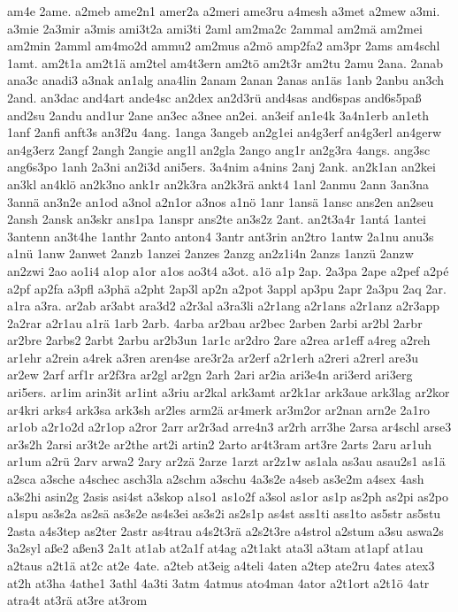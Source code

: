 {am4e
2ame.
a2meb
ame2n1
amer2a
a2meri
ame3ru
a4mesh
a3met
a2mew
a3mi.
a3mie
2a3mir
a3mis
ami3t2a
ami3ti
2aml
am2ma2c
2ammal
am2mä
am2mei
am2min
2amml
am4mo2d
ammu2
am2mus
a2mö
amp2fa2
am3pr
2ams
am4schl
1amt.
am2t1a
am2t1ä
am2tel
am4t3ern
am2tö
am2t3r
am2tu
2amu
2ana.
2anab
ana3c
anadi3
a3nak
an1alg
ana4lin
2anam
2anan
2anas
an1äs
1anb
2anbu
an3ch
2and.
an3dac
and4art
ande4sc
an2dex
an2d3rü
and4sas
and6spas
and6s5paß
and2su
2andu
and1ur
2ane
an3ec
a3nee
an2ei.
an3eif
an1e4k
3a4n1erb
an1eth
1anf
2anfi
anft3s
an3f2u
4ang.
1anga
3angeb
an2g1ei
an4g3erf
an4g3erl
an4gerw
an4g3erz
2angf
2angh
2angie
ang1l
an2gla
2ango
ang1r
an2g3ra
4angs.
ang3sc
ang6s3po
1anh
2a3ni
an2i3d
ani5ers.
3a4nim
a4nins
2anj
2ank.
an2k1an
an2kei
an3kl
an4klö
an2k3no
ank1r
an2k3ra
an2k3rä
ankt4
1anl
2anmu
2ann
3an3na
3annä
an3n2e
an1od
a3nol
a2n1or
a3nos
a1nö
1anr
1ansä
1ansc
ans2en
an2seu
2ansh
2ansk
an3skr
ans1pa
1anspr
ans2te
an3s2z
2ant.
an2t3a4r
1antá
1antei
3antenn
an3t4he
1anthr
2anto
anton4
3antr
ant3rin
an2tro
1antw
2a1nu
anu3s
a1nü
1anw
2anwet
2anzb
1anzei
2anzes
2anzg
an2z1i4n
2anzs
1anzü
2anzw
an2zwi
2ao
ao1i4
a1op
a1or
a1os
ao3t4
a3ot.
a1ö
a1p
2ap.
2a3pa
2ape
a2pef
a2pé
a2pf
ap2fa
a3pfl
a3phä
a2pht
2ap3l
ap2n
a2pot
3appl
ap3pu
2apr
2a3pu
2aq
2ar.
a1ra
a3ra.
ar2ab
ar3abt
ara3d2
a2r3al
a3ra3li
a2r1ang
a2r1ans
a2r1anz
a2r3app
2a2rar
a2r1au
a1rä
1arb
2arb.
4arba
ar2bau
ar2bec
2arben
2arbi
ar2bl
2arbr
ar2bre
2arbs2
2arbt
2arbu
ar2b3un
1ar1c
ar2dro
2are
a2rea
ar1eff
a4reg
a2reh
ar1ehr
a2rein
a4rek
a3ren
aren4se
are3r2a
ar2erf
a2r1erh
a2reri
a2rerl
are3u
ar2ew
2arf
arf1r
ar2f3ra
ar2gl
ar2gn
2arh
2ari
ar2ia
ari3e4n
ari3erd
ari3erg
ari5ers.
ar1im
arin3it
ar1int
a3riu
ar2kal
ark3amt
ar2k1ar
ark3aue
ark3lag
ar2kor
ar4kri
arks4
ark3sa
ark3sh
ar2les
arm2ä
ar4merk
ar3m2or
ar2nan
arn2e
2a1ro
ar1ob
a2r1o2d
a2r1op
a2ror
2arr
ar2r3ad
arre4n3
ar2rh
arr3he
2arsa
ar4schl
arse3
ar3s2h
2arsi
ar3t2e
ar2the
art2i
artin2
2arto
ar4t3ram
art3re
2arts
2aru
ar1uh
ar1um
a2rü
2arv
arwa2
2ary
ar2zä
2arze
1arzt
ar2z1w
as1ala
as3au
asau2s1
as1ä
a2sca
a3sche
a4schec
asch3la
a2schm
a3schu
4a3s2e
a4seb
as3e2m
a4sex
4ash
a3s2hi
asin2g
2asis
asi4st
a3skop
a1so1
as1o2f
a3sol
as1or
as1p
as2ph
as2pi
as2po
a1spu
as3s2a
as2sä
as3s2e
as4s3ei
as3s2i
as2s1p
as4st
ass1ti
ass1to
as5str
as5stu
2asta
a4s3tep
as2ter
2astr
as4trau
a4s2t3rä
a2s2t3re
a4strol
a2stum
a3su
aswa2s
3a2syl
aße2
aßen3
2a1t
at1ab
at2a1f
at4ag
a2t1akt
ata3l
a3tam
at1apf
at1au
a2taus
a2t1ä
at2c
at2e
4ate.
a2teb
at3eig
a4teli
4aten
a2tep
ate2ru
4ates
atex3
at2h
at3ha
4athe1
3athl
4a3ti
3atm
4atmus
ato4man
4ator
a2t1ort
a2t1ö
4atr
atra4t
at3rä
at3re
at3rom
}
